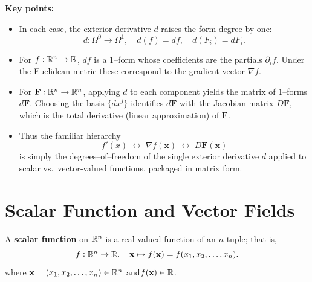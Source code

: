 \documentclass[11pt,openany]{article}
\renewcommand{\vec}[1]{\mathbf{#1}}
\begin{document}
\bigskip

\noindent\textbf{Key points:}
\begin{itemize}
	\item In each case, the exterior derivative \(d\) raises the form‐degree by one:
	\[
	d:\Omega^0\to\Omega^1,
	\quad
	d(f)=df,\quad
	d(F_i)=dF_i.
	\]
	\item For \(f:\mathbb{R}^n\to\mathbb{R}\), \(df\) is a \(1\)–form whose coefficients are the partials \(\partial_i f\).  Under the Euclidean metric these correspond to the gradient vector \(\nabla f\).  
	\item For \(\mathbf F:\mathbb{R}^n\to\mathbb{R}^n\), applying \(d\) to each component yields the matrix of \(1\)–forms \(d\mathbf F\).  Choosing the basis \(\{dx^j\}\) identifies \(d\mathbf F\) with the Jacobian matrix \(D\mathbf F\), which is the total derivative (linear approximation) of \(\mathbf F\).  
	\item Thus the familiar hierarchy
	\[
	f'(x)
	\;\longleftrightarrow\;
	\nabla f(\mathbf x)
	\;\longleftrightarrow\;
	D\mathbf F(\mathbf x)
	\]
	is simply the degrees–of–freedom of the single exterior derivative \(d\) applied to scalar vs.\ vector‐valued functions, packaged in matrix form.
\end{itemize}







\newpage
\section{Scalar Function and Vector Fields}
\begin{definition*}
	A \textbf{scalar function} on \(\mathbb{R}^n\) is a real‑valued function of an \(n\)-tuple; that is,
	\[
	f:\R^n\to\R,\quad\vec{x}\mapsto f(\vec{x})=f(x_1,x_2,\dots,x_n).
	\] where \(\vec{x}=(x_1,x_2,\dots,x_n)\in\R^n\) and\(f(\vec{x})\in\R\).
\end{definition*}
\end{document}
